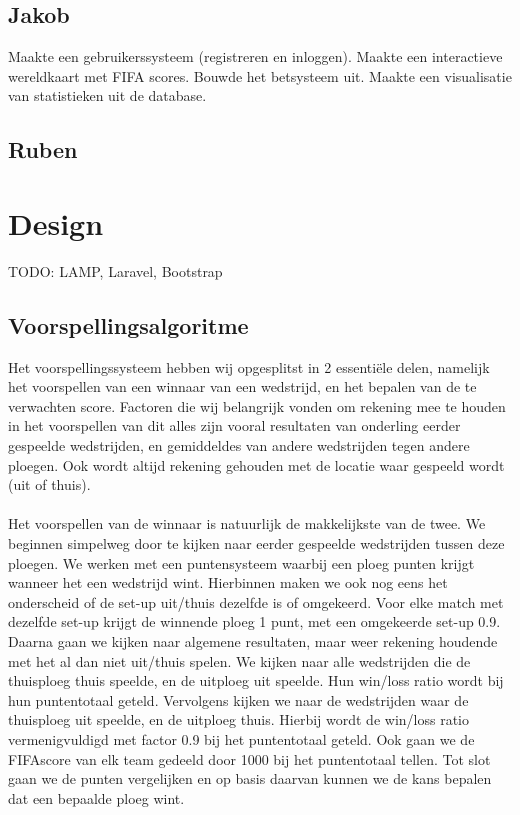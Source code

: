 \documentclass[11pt, a4paper]{article}
\begin{document}
\subsection{Jakob}
Maakte een gebruikerssysteem (registreren en inloggen). Maakte een interactieve wereldkaart met FIFA scores. Bouwde het betsysteem uit. Maakte een visualisatie van statistieken uit de database.
\subsection{Ruben}


\section{Design}
TODO: LAMP, Laravel, Bootstrap
\subsection{Voorspellingsalgoritme}
Het voorspellingssysteem hebben wij opgesplitst in 2 essenti\"ele delen, namelijk het voorspellen van een winnaar van een wedstrijd, en het bepalen van de te verwachten score. Factoren die wij belangrijk vonden om rekening mee te houden in het voorspellen van dit alles zijn vooral resultaten van onderling eerder gespeelde wedstrijden, en gemiddeldes van andere wedstrijden tegen andere ploegen. Ook wordt altijd rekening gehouden met de locatie waar gespeeld wordt (uit of thuis).
\\
\\
Het voorspellen van de winnaar is natuurlijk de makkelijkste van de twee. We beginnen simpelweg door te kijken naar eerder gespeelde wedstrijden tussen deze ploegen. We werken met een puntensysteem waarbij een ploeg punten krijgt wanneer het een wedstrijd wint. Hierbinnen maken we ook nog eens het onderscheid of de set-up uit/thuis dezelfde is of omgekeerd. Voor elke match met dezelfde set-up krijgt de winnende ploeg 1 punt, met een omgekeerde set-up 0.9.
Daarna gaan we kijken naar algemene resultaten, maar weer rekening houdende met het al dan niet uit/thuis spelen. We kijken naar alle wedstrijden die de thuisploeg thuis speelde, en de uitploeg uit speelde. Hun win/loss ratio wordt bij hun puntentotaal geteld. Vervolgens kijken we naar de wedstrijden waar de thuisploeg uit speelde, en de uitploeg thuis. Hierbij wordt de win/loss ratio vermenigvuldigd met factor 0.9 bij het puntentotaal geteld. Ook gaan we de FIFAscore van elk team gedeeld door 1000 bij het puntentotaal tellen. Tot slot gaan we de punten vergelijken en op basis daarvan kunnen we de kans bepalen dat een bepaalde ploeg wint.
\end{document}
